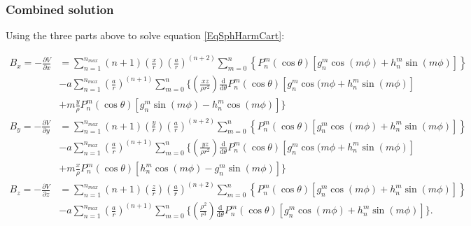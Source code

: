 \documentclass[]{article}
\begin{document}
		\subsubsection{Combined solution}	
			
			Using the three parts above to solve equation \ref{EqSphHarmCart}:
			
			\begin{align}
				B_x = -\frac{\partial V}{\partial x} &= \sum_{n=1}^{n_{max}} (n + 1)\left(\frac{x}{r}\right)\left(\frac{a}{r}\right)^{(n+2)} \sum_{m=0}^{n} \left\{ P_n^m(\cos{\theta}) \left[ g_n^m \cos{(m\phi)} + h_n^m \sin{(m\phi)}\right] \right\}    \nonumber \\
				&- a \sum_{n=1}^{n_{max}} \left(\frac{a}{r}\right)^{(n+1)} \sum_{m=0}^{n} \biggl\{ \left(\frac{xz}{\rho r^2}\right)\frac{\text{d}}{\text{d} \theta} P_n^m(\cos{\theta}) \left[g_n^m \cos{(m\phi} + h_n^m \sin{(m\phi)} \right] \nonumber \\
				&+ m\frac{y}{\rho} P_n^m(\cos{\theta}) \left[ g_n^m\sin{(m\phi)} - h_n^m \cos{(m\phi)}\right]  \biggr\} \\
				B_y = -\frac{\partial V}{\partial y} &= \sum_{n=1}^{n_{max}} (n + 1)\left(\frac{y}{r}\right)\left(\frac{a}{r}\right)^{(n+2)} \sum_{m=0}^{n} \left\{ P_n^m(\cos{\theta}) \left[ g_n^m \cos{(m\phi)} + h_n^m \sin{(m\phi)}\right] \right\}    \nonumber \\
				&- a \sum_{n=1}^{n_{max}} \left(\frac{a}{r}\right)^{(n+1)} \sum_{m=0}^{n} \biggl\{ \left(\frac{yz}{\rho r^2}\right)\frac{\text{d}}{\text{d} \theta} P_n^m(\cos{\theta}) \left[g_n^m \cos{(m\phi} + h_n^m \sin{(m\phi)} \right] \nonumber \\
				&+ m\frac{x}{\rho} P_n^m(\cos{\theta}) \left[ h_n^m \cos{(m\phi)} - g_n^m\sin{(m\phi)}\right]  \biggr\} \\
				B_z = -\frac{\partial V}{\partial z} &= \sum_{n=1}^{n_{max}} (n + 1)\left(\frac{z}{r}\right)\left(\frac{a}{r}\right)^{(n+2)} \sum_{m=0}^{n} \left\{ P_n^m(\cos{\theta}) \left[ g_n^m \cos{(m\phi)} + h_n^m \sin{(m\phi)}\right] \right\}    \nonumber \\
				&- a \sum_{n=1}^{n_{max}} \left(\frac{a}{r}\right)^{(n+1)} \sum_{m=0}^{n} \biggl\{ \left(\frac{\rho^2}{ r^3}\right)\frac{\text{d}}{\text{d} \theta} P_n^m(\cos{\theta}) \left[g_n^m \cos{(m\phi)} + h_n^m \sin{(m\phi)} \right]  \biggr\}.				
			\end{align}
			


\end{document}
